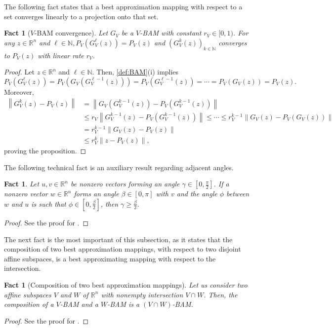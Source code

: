 \documentclass[smallextended,numbook,nospthms]{svjour3}
\theoremstyle{plain}
\newtheorem{fact}[theorem]{Fact}
\theoremstyle{definition}
\def\RR{\mathds R}
\def\NN{\mathds N}
\begin{document}
The following fact states that a best approximation mapping with respect to a set converges linearly to a projection onto that set.
\begin{fact}[$V$-BAM convergence]\label{fact:BAM conv}
	Let $G_{V}$ be a $V$-BAM with constant $r_{V} \in[0,1)$. For any $z \in \RR^{n}$ and $\ell \in \NN, P_{V}\left(G_{V}^{\ell}(z)\right)=P_{V}(z)$ and $\left(G_{V}^{k}(z)\right)_{k \in \NN}$ converges to $P_{V}(z)$ with linear rate $r_{V}$.
\end{fact}
\begin{proof}
	Let $z \in \RR^{n}$ and $\ell \in \NN$. Then, \cref{def:BAM}(i) implies
	$$
	P_{V}\left(G_{V}^{\ell}(z)\right)=P_{V}\left(G_{V}\left(G_{V}^{\ell-1}(z)\right)\right)=P_{V}\left(G_{V}^{\ell-1}(z)\right)=\cdots=P_{V}\left(G_{V}(z)\right)=P_{V}(z).
	$$
	Moreover,
	\begin{align}
		\left\|G_{V}^{k}(z)-P_{V}(z)\right\| &=\left\|G_{V}\left(G_{V}^{k-1}(z)\right)-P_{V}\left(G_{V}^{k-1}(z)\right)\right\| \\
		& \leq r_{V}\left\|G_{V}^{k-1}(z)-P_{V}\left(G_{V}^{k-1}(z)\right)\right\| \leq \cdots \leq r_{V}^{k-1}\left\|G_{V}(z)-P_{V}\left(G_{V}(z)\right)\right\| \\
		&=r_{V}^{k-1}\left\|G_{V}(z)-P_{V}(z)\right\| \\
		& \leq r_{V}^{k}\left\|z-P_{V}(z)\right\|,
	\end{align}
	proving the proposition.
\end{proof}

The following technical fact is an auxiliary result regarding adjacent angles.
\begin{fact}\label{fact:BAM angle fact}
	Let $u, v \in \RR^{n}$ be nonzero vectors forming an angle $\gamma \in\left[0, \frac{\pi}{2}\right]$. If a nonzero vector $w \in \RR^{n}$ forms an angle $\beta \in[0, \pi]$ with $v$ and the angle $\phi$ between $w$ and $u$ is such that $\phi \in\left[0, \frac{\beta}{2}\right]$, then $\gamma \geq \frac{\beta}{2}$.
\end{fact}
\begin{proof}
	See the proof for \cite[Proposition 2]{Behling:2019dj}.
\end{proof}

The next fact is the most important of this subsection, as it states that the composition of two best approximation mappings, with respect to two disjoint affine subspaces, is a best approximating mapping with respect to the intersection.
\begin{fact}[Composition of two best approximation mappings]\label{fact:BAM comp}
	Let us consider two affine subspaces $V$ and $W$ of $\RR^{n}$ with nonempty intersection $V \cap W$. Then, the composition of a $V$-BAM and a $W$-BAM is a $(V \cap W)$-BAM.
\end{fact}
\begin{proof}
See the proof for \cite[Lemma 1]{Behling:2019dj}.
\end{proof}
\end{document}
